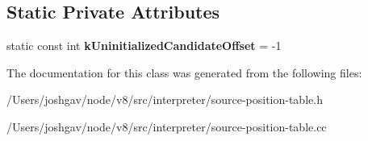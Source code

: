 \subsection*{Static Private Attributes}
\begin{DoxyCompactItemize}
\item 
static const int {\bfseries k\+Uninitialized\+Candidate\+Offset} = -\/1\hypertarget{classv8_1_1internal_1_1interpreter_1_1_source_position_table_builder_aa5b0da5d5de2444a8feaeb031fa70827}{}\label{classv8_1_1internal_1_1interpreter_1_1_source_position_table_builder_aa5b0da5d5de2444a8feaeb031fa70827}

\end{DoxyCompactItemize}


The documentation for this class was generated from the following files\+:\begin{DoxyCompactItemize}
\item 
/\+Users/joshgav/node/v8/src/interpreter/source-\/position-\/table.\+h\item 
/\+Users/joshgav/node/v8/src/interpreter/source-\/position-\/table.\+cc\end{DoxyCompactItemize}
